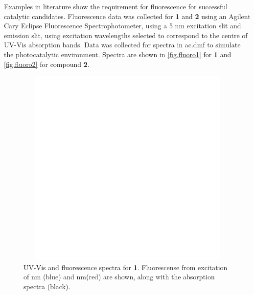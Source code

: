 Examples in literature  show the requirement for fluorescence for successful catalytic candidates. Fluorescence data was collected for \textbf{1} and \textbf{2} using an Agilent Cary Eclipse Fluorescence Spectrophotometer, using a 5 nm excitation slit and emission slit, using excitation wavelengths selected to correspond to the centre of UV-Vis absorption bands. Data was collected for spectra in \gls{ac.dmf} to simulate the photocatalytic environment. Spectra are shown in \autoref{fig.fluoro1} for \textbf{1} and \autoref{fig.fluoro2} for compound \textbf{2}.

\begin{figure}[!htb]
 \centering
  \includegraphics[clip=true, width=120mm, height=100mm, keepaspectratio]{images/insertgraphic.eps}
 \caption[UV-Vis and fluorescence spectra for \textbf{1}]{UV-Vis and fluorescence spectra for \textbf{1}. Fluorescense from excitation of  nm (blue) and  nm(red) are shown, along with the absorption spectra (black).}
 \label{fig.fluoro1}
\end{figure}

